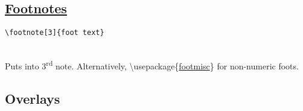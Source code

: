 \subsection*{\href{https://www.overleaf.com/learn/latex/Footnotes}{Footnotes}}

\begin{minipage}{6cm}
\begin{lstlisting}
\footnote[3]{foot text}
\end{lstlisting}
\end{minipage} \\
Puts  into 3\textsuperscript{rd} note.
Alternatively, \textbackslash usepackage\{\href{http://mirrors.ctan.org/macros/latex/contrib/footmisc/footmisc.pdf}{footmisc}\} for non-numeric foots. \\

\subsection*{Overlays}


\ \\